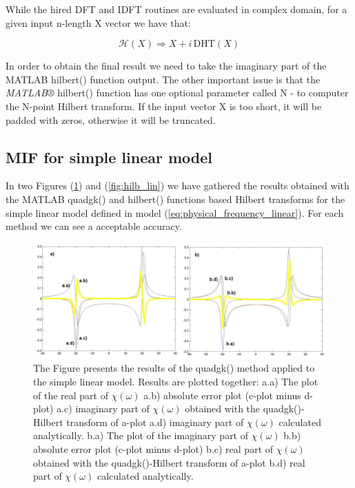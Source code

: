 \documentclass[12pt,twoside,a4paper]{article}
\numberwithin{equation}{subsection}
\numberwithin{figure}{subsection}
\begin{document}
While the hired DFT and IDFT routines are evaluated in complex domain, for a given input n-length X vector we have that:

\begin{equation} \label{eq:matlab_implication}
	\mathcal{H}(X) \Rightarrow X + i \, \mathrm{DHT}(X)
\end{equation}

In order to obtain the final result we need to take the imaginary part of the MATLAB hilbert() function output. The other
important issue is that the \textit{MATLAB®} hilbert() function has one optional parameter called N - to computer the N-point
Hilbert transform. If the input vector X is too short, it will be padded with zeros, otherwise it will be truncated. 

\subsection{MIF for simple linear model} \label{chap:matlab_lin}

In two Figures (\ref{fig:quadgk_lin}) and (\ref{fig:hilb_lin}) we have ga\-thered the results ob\-tained with the MATLAB quadgk() and
hilbert() functions based Hil\-bert trans\-forms for the simple linear model defined in model (\ref{eq:physical_frequency_linear}).
For each method we can see a accep\-table accu\-racy.

\begin{figure} 
  \includegraphics[width=150mm]{img/quadgk_lin.png}
  \caption{The Figure presents the results of the quadgk() method applied to the simple linear model. Results are plotted together:
   a.a) The plot of the real part of $\chi (\omega )$ 
   a.b) absolute error plot (c-plot minus d-plot) 
   a.c) imaginary part of $\chi (\omega )$ obtained with the quadgk()-Hilbert transform of a-plot 
   a.d) imaginary part of $\chi (\omega )$  calculated analytically. 
   b.a) The plot of the imaginary part of $\chi (\omega )$ 
   b.b) absolute error plot (c-plot minus d-plot) 
   b.c) real part of $\chi (\omega )$ obtained with the quadgk()-Hilbert transform of a-plot 
   b.d) real part of $\chi (\omega )$ calculated analytically. \label{fig:quadgk_lin}
  }
\end{figure}
\end{document}
